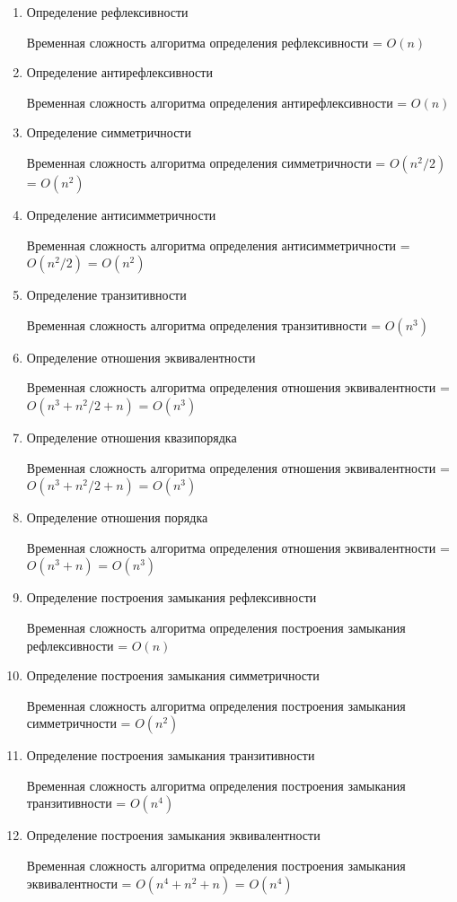 \documentclass[bachelor, och, labwork]{shiza}
\begin{document}
	\begin{enumerate}
		\item Определение рефлексивности
		
		Временная сложность алгоритма определения рефлексивности = $O(n)$
		\item Определение антирефлексивности

		Временная сложность алгоритма определения антирефлексивности = $O(n)$
		\item Определение симметричности

		Временная сложность алгоритма определения симметричности = $O(n^2/2)$ = $O(n^2)$
		\item Определение антисимметричности

		Временная сложность алгоритма определения антисимметричности = $O(n^2/2)$ = $O(n^2)$
		\item Определение транзитивности

		Временная сложность алгоритма определения транзитивности = $O(n^3)$
		
		\item Определение отношения эквивалентности
		
		Временная сложность алгоритма определения отношения эквивалентности = $O(n^3 + n^2/2 + n)$ = $O(n^3)$
		
		\item Определение отношения квазипорядка

		Временная сложность алгоритма определения отношения эквивалентности = $O(n^3 + n^2/2 + n)$ = $O(n^3)$
		
		\item Определение отношения порядка
		
		Временная сложность алгоритма определения отношения эквивалентности = $O(n^3 + n)$ = $O(n^3)$
		
		\item Определение построения замыкания рефлексивности
		
		Временная сложность алгоритма определения построения замыкания рефлексивности = $O(n)$
		
		\item Определение построения замыкания симметричности
		
		Временная сложность алгоритма определения построения замыкания симметричности = $O(n^2)$
		
		\item Определение построения замыкания транзитивности

		Временная сложность алгоритма определения построения замыкания транзитивности = $O(n^4)$

		\item Определение построения замыкания эквивалентности

		Временная сложность алгоритма определения построения замыкания эквивалентности = $O(n^4 + n^2 + n)$ = $O(n^4)$
	\end{enumerate}
	
\end{document}
